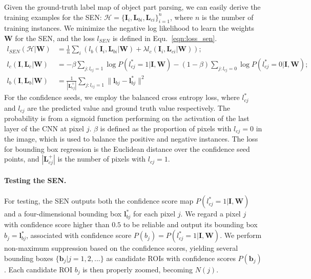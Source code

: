 \documentclass[runningheads]{llncs}
\newcommand{\hua}[1]{{\mathcal #1}}
\newcommand{\ve}[1]{{\mathbf #1}}
\begin{document}
Given the ground-truth label map of object part parsing, we can easily derive the training examples for the SEN: $\hua{H} = \{\ve{I}_i, \ve{L}_{bi}, \ve{L}_{ci}\}_{i=1}^{n}$, where $n$ is the number of training instances. We minimize the negative log likelihood to learn the weights $\ve{W}$ for the SEN, and the loss $l_{SEN}$ is defined in Equ.~\ref{eqn:loss_sen}.
{\small
\begin{align}
l_{SEN}(\hua{H}|\ve{W}) &= \frac{1}{n}\sum\nolimits_{i}(l_{b}(\ve{I}_i, \ve{L}_{bi} | \ve{W}) + \lambda l_{c}(\ve{I}_i, \ve{L}_{ci} | \ve{W})); \nonumber\\
l_{c}(\ve{I}, \ve{L}_{c}|\ve{W}) &= -\beta\sum\limits_{j:l_{cj}=1} \log P(l_{cj}^*=1|\ve{I}, \ve{W}) -(1-\beta)\sum\limits_{j:l_{cj}=0}\log P(l_{cj}^*=0|\ve{I}, \ve{W}); \nonumber \\
l_{b}(\ve{I}, \ve{L}_{b}|\ve{W}) &= \frac{1}{|\ve{L}_{cj}^+|}\sum\nolimits_{j:l_{cj}=1}\|\ve{l}_{bj}-\ve{l}_{bj}^*\|^2
\label{eqn:loss_sen}
\end{align}
}
For the confidence seeds, we employ the balanced cross entropy loss, where $l_{cj}^*$ and $l_{cj}$ are the predicted value and ground truth value respectively. The probability is from a sigmoid function performing on the activation of the last layer of the CNN at pixel $j$.  $\beta$ is defined as the proportion of pixels with $l_{cj}=0$ in the image, which is used to balance the positive and negative instances. The loss for bounding box regression is the Euclidean distance over the confidence seed points, and $|\ve{L}_{cj}^+|$ is the number of pixels with $l_{cj}=1$.

\paragraph{Testing the SEN.} For testing, the SEN outputs both the confidence score map $P(l_{cj}^*=1|\ve{I}, \ve{W})$ and a four-dimensional bounding box $\ve{l}_{bj}^*$ for each pixel $j$.
We regard a pixel $j$ with confidence score higher than $0.5$ to be reliable and output its bounding box $b_j = \ve{l}_{bj}^*$, associated with confidence score $P(b_j) = P(l_{cj}^*=1|\ve{I}, \ve{W})$. We perform non-maximum suppression based on the confidence scores, yielding several bounding boxes $\{\ve{b}_j | j=1,2,...\}$ as candidate ROIs with confidence scores $P(\ve{b}_j)$. Each candidate ROI $b_j$ is then properly zoomed, becoming $N(j)$.
\end{document}
